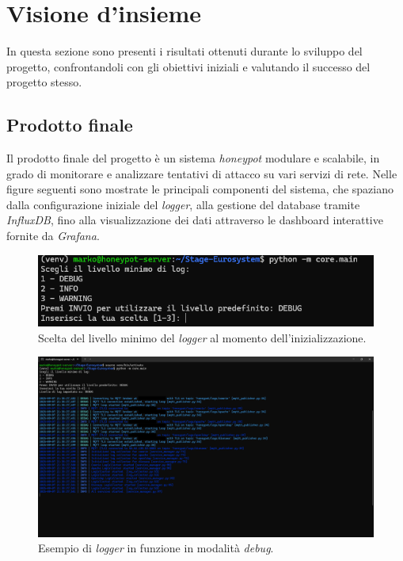 \section{Visione d'insieme}
In questa sezione sono presenti i risultati ottenuti durante lo sviluppo del progetto, confrontandoli con gli obiettivi iniziali e valutando il successo del progetto stesso.
\subsection{Prodotto finale}
Il prodotto finale del progetto è un sistema \textit{honeypot} modulare e scalabile, in grado di monitorare e analizzare tentativi di attacco su vari servizi di rete.
Nelle figure seguenti sono mostrate le principali componenti del sistema, che spaziano dalla configurazione iniziale del \textit{logger}, alla gestione del database tramite \textit{InfluxDB}, fino alla visualizzazione dei dati attraverso le dashboard interattive fornite da \textit{Grafana}.
\begin{figure}[H]
    \begin{center}
    \includegraphics[width=\textwidth]{img/environment.png}
    \caption{Scelta del livello minimo del \textit{logger} al momento dell'inizializzazione.}
    \label{fig:environment}
    \end{center}
\end{figure}
\begin{figure}[H]
    \begin{center}
    \includegraphics[width=\textwidth]{img/logger.png}
    \caption{Esempio di \textit{logger} in funzione in modalità \textit{debug}.}
    \label{fig:logger}
    \end{center}
\end{figure}
